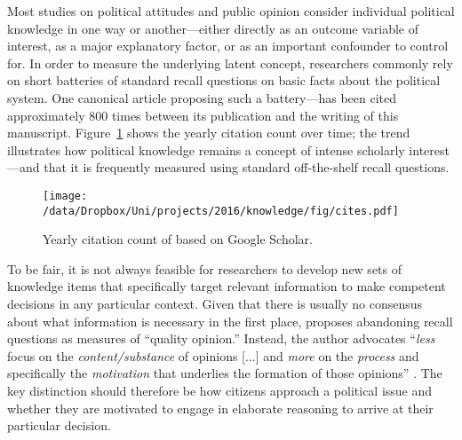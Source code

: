 
Most studies on political attitudes and public opinion consider individual political knowledge in one way or another---either directly as an outcome variable of interest, as a major explanatory factor, or as an important confounder to control for. In order to measure the underlying latent concept, researchers commonly rely on short batteries of standard recall questions on basic facts about the political system. One canonical article proposing such a battery--\citet{carpini1993measuring}--has been cited approximately 800 times between its publication and the writing of this manuscript. Figure~\ref{fig:carpini} shows the yearly citation count over time; the trend illustrates how political knowledge remains a concept of intense scholarly interest---and that it is frequently measured using standard off-the-shelf recall questions.

\begin{figure}[h]\centering
	\texttt{[image: /data/Dropbox/Uni/projects/2016/knowledge/fig/cites.pdf]}
	\caption[Yearly citation count of \citet{carpini1993measuring}]{Yearly citation count of \citet{carpini1993measuring} based on Google Scholar.}\label{fig:carpini}
\end{figure}

To be fair, it is not always feasible for researchers to develop new sets of knowledge items that specifically target relevant information to make competent decisions in any particular context. Given that there is usually no consensus about what information is necessary in the first place, \citet{druckman2014pathologies} proposes abandoning recall questions as measures of ``quality opinion.'' Instead, the author advocates ``\textit{less} focus on the \textit{content/substance} of opinions [...] and \textit{more} on the \textit{process} and specifically the \textit{motivation} that underlies the formation of those opinions'' \citeyearpar[478, emphasis in the original]{druckman2014pathologies}. The key distinction should therefore be how citizens approach a political issue and whether they are motivated to engage in elaborate reasoning to arrive at their particular decision.


